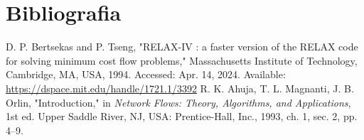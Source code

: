 \documentclass[12pt, a4paper, titlepage]{article}
\begin{document}
\section{Bibliografia}
\def\refname{}
\vspace{-1.5cm}
\begin{thebibliography}{9}
        D. P. Bertsekas and P. Tseng, "RELAX-IV : a faster version of the RELAX code for solving
        minimum cost flow problems,"{} Massachusetts Institute of Technology, Cambridge, MA, USA,
        1994. Accessed: Apr. 14, 2024. Available: \url{https://dspace.mit.edu/handle/1721.1/3392}
        R. K. Ahuja, T. L. Magnanti, J. B. Orlin, "Introduction,"{} in \emph{Network Flows: Theory,
        Algorithms, and Applications}, 1st ed. Upper Saddle River, NJ, USA: Prentice-Hall, Inc.,
        1993, ch. 1, sec. 2, pp. 4--9.
\end{thebibliography}
\end{document}
